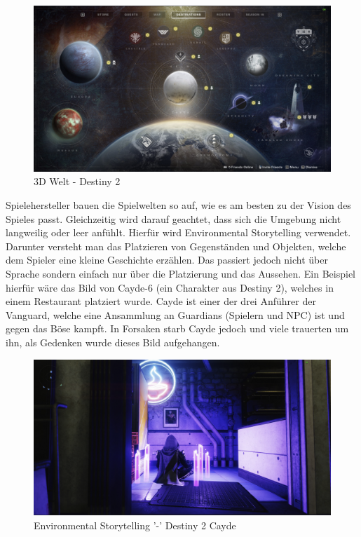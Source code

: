 
\begin{figure}
    \centering
    \includegraphics[scale=0.3]{pics/3d_welt_destiny_planets}
    \caption{3D Welt - Destiny 2}
    \label{fig:3d_environment_destiny2}
\end{figure}

Spielehersteller bauen die Spielwelten so auf, wie es am besten zu der Vision des Spieles passt.
Gleichzeitig wird darauf geachtet, dass sich die Umgebung nicht langweilig oder leer anfühlt.
Hierfür wird Environmental Storytelling verwendet.
Darunter versteht man das Platzieren von Gegenständen und Objekten,
welche dem Spieler eine kleine Geschichte erzählen.
Das passiert jedoch nicht über Sprache sondern einfach nur über die Platzierung und das Aussehen.
Ein Beispiel hierfür w\"are das Bild von Cayde-6 (ein Charakter aus Destiny 2), welches in einem Restaurant platziert wurde.
Cayde ist einer der drei Anführer der Vanguard, welche eine Ansammlung an Guardians (Spielern und NPC) ist und gegen das Böse kampft.
In Forsaken starb Cayde jedoch und viele trauerten um ihn, als Gedenken wurde dieses Bild aufgehangen.
~\cite{GameDeveloper_2022}

\begin {figure}
    \includegraphics[scale=0.3]{pics/3d_welt_destiny2-environmental-storytelling}
    \caption{Environmental Storytelling '-' Destiny 2 Cayde}
    \label{fig:3d_environmental_storytelling_destiny2}
\end {figure}


